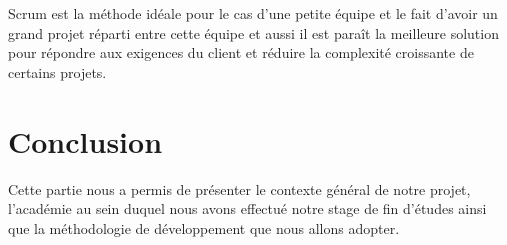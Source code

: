 Scrum est la méthode idéale pour le cas d'une petite équipe et le fait d'avoir
un grand projet réparti entre cette équipe et aussi il est paraît la meilleure
solution pour répondre aux exigences du client et réduire la complexité
croissante de certains projets.

\section*{Conclusion}


Cette partie nous a permis de présenter le contexte général de notre projet,
l'académie  au sein duquel nous avons effectué notre
stage de fin d'études ainsi que la méthodologie de développement
 que nous allons adopter.
